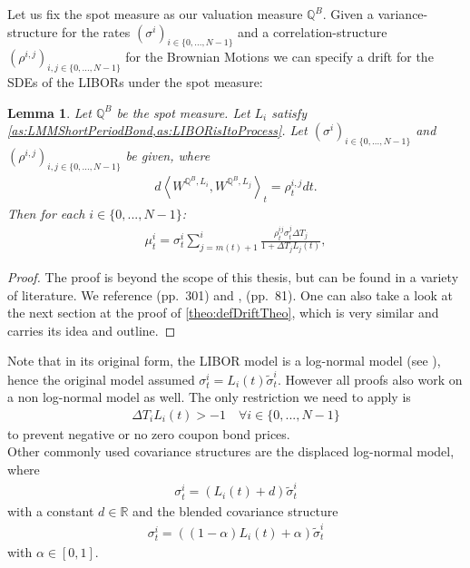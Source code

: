 \documentclass[12pt]{article}
\newtheorem{lemma}[theorem]{Lemma}
\begin{document}
	Let us fix the spot measure as our valuation measure $\mathbb{Q}^B$.
	Given a variance-structure for the rates $(\sigma^i)_{i\in\{0,...,N-1\}}$ and a correlation-structure $(\rho^{i,j})_{i,j \in \{0,...,N-1\}}$ for the Brownian Motions
	we can specify a drift for the SDEs of the LIBORs under the spot measure:
	\begin{lemma}\label{lem:LMMDriftSpec}
		Let $\mathbb{Q}^B$ be the spot measure.
		Let $L_i$ satisfy \cref{as:LMMShortPeriodBond,as:LIBORisItoProcess}. Let $(\sigma^i)_{i\in\{0,...,N-1\}}$ and $(\rho^{i,j})_{i,j \in \{0,...,N-1\}}$ be given, where
		\begin{align*}
			d\left\langle W^{\mathbb{Q}^B, L_i}, W^{\mathbb{Q}^B, L_j} \right\rangle_t = \rho^{i,j}_t dt.
		\end{align*}
		Then for each $i \in \{0, ..., N-1\}$:
		\begin{align*}
			\mu^{i}_t = \sigma^{i}_t\sum_{j=m(t)+1}^{i}\frac{\rho^{i j}_t \sigma^{j}_t\Delta T_j}{1 + \Delta T_j L_j(t)},
		\end{align*}
	\end{lemma}
	\begin{proof}
		The proof is beyond the scope of this thesis, but can be found in a variety of literature. We reference \cite{FriesBook} (pp.\ 301) and \cite{fima3Lecture}, (pp.\ 81). One can also take a look at the next section at the proof of \cref{theo:defDriftTheo}, which is very similar  and carries its idea and outline.
	\end{proof}
	Note that in its original form, the LIBOR model is a log-normal model (see \cite{FriesBook}), hence the original model assumed $\sigma^i_t = L_i(t)\tilde{\sigma}^i_t$. However all proofs also work on a non log-normal model as well. The only restriction we need to apply is
	\begin{align*}
		\Delta T_iL_i(t) > -1 \quad \forall i \in \{0,...,N-1\}
	\end{align*}
	to prevent negative or no zero coupon bond prices.\\
	Other commonly used covariance structures are the displaced log-normal model, where
	\begin{align*}
		\sigma^i_t = \left(L_i(t) + d\right)\tilde{\sigma}^i_t
	\end{align*}
	with a constant $d\in \mathbb{R}$ and the blended covariance structure
	\begin{align*}
		\sigma^i_t = \left((1-\alpha) L_i(t) + \alpha\right)\tilde{\sigma}^i_t
	\end{align*}
	with $\alpha \in \left[0, 1\right]$.\\
	
\end{document}
